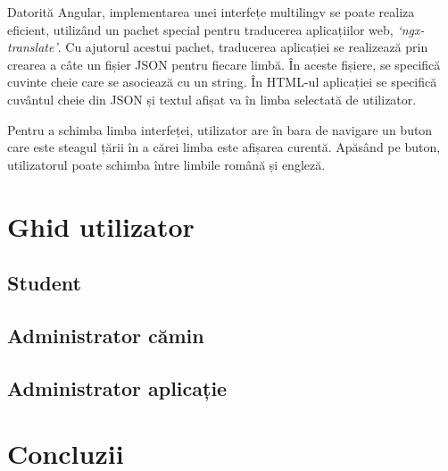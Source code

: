 \documentclass[12pt,a4paper]{report}
\theoremstyle{definition}
\theoremstyle{remark}
\begin{document}
\par Datorită Angular, implementarea unei interfețe multilingv se poate realiza eficient, utilizând un pachet special pentru traducerea aplicațiilor web, \textit{`ngx-translate'}\cite{ngx_translate}. Cu ajutorul acestui pachet, traducerea aplicației se realizează prin crearea a câte un fișier JSON pentru fiecare limbă. În aceste fișiere, se specifică cuvinte cheie care se asociează cu un string. În HTML-ul aplicației se specifică cuvântul cheie din JSON și textul afișat va în limba selectată de utilizator.

\par Pentru a schimba limba interfeței, utilizator are în bara de navigare un buton care este steagul țării în a cărei limba este afișarea curentă. Apăsând pe buton, utilizatorul poate schimba între limbile română și engleză.


\chapter{Ghid utilizator}
\section{Student}
\section{Administrator cămin}
\section{Administrator aplicație}

\chapter{Concluzii}
\section{}



\end{document}

